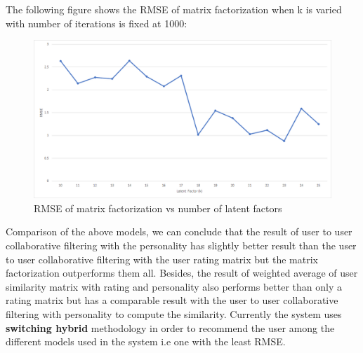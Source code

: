 The following figure shows the RMSE of matrix factorization when k is varied with number of iterations is fixed at 1000:
\begin{figure}[!ht]
\centering
\includegraphics[width = \textwidth ]{fig/rmse_k.png}
\caption{RMSE of matrix factorization vs number of latent factors}
\label{fig:rmse_k}
\end{figure}

Comparison of the above models, we can conclude that the result of user to user collaborative filtering with the personality has slightly better result than the user to user collaborative filtering with the user rating matrix but the matrix factorization outperforms them all. Besides, the result of weighted average of user similarity matrix with rating and personality also performs better than only a rating matrix but has a comparable result with the user to user collaborative filtering with personality to compute the similarity. Currently the system uses \textbf{switching hybrid} methodology in order to recommend the user among the different models used in the system i.e one with the least RMSE.
